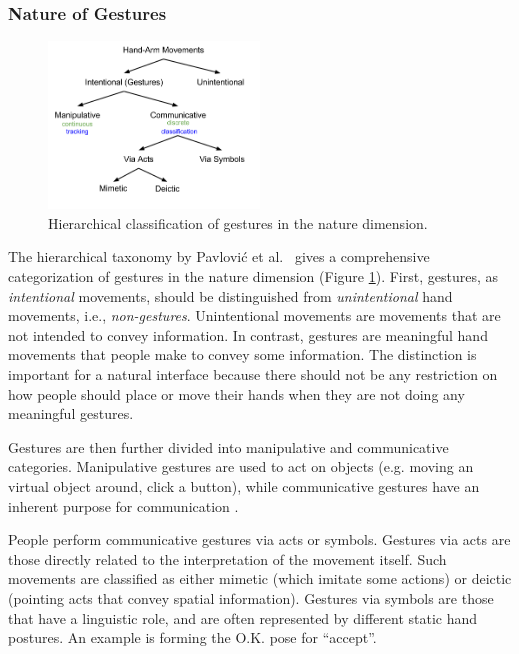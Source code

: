 \subsubsection{Nature of Gestures}
\begin{figure}[tbh]
  \centering
  \includegraphics[width=0.5\textwidth]{figures/taxonomy.png} 
  \caption{Hierarchical classification of gestures in the nature dimension.}
  \label{fig:taxonomy}
\end{figure}

The hierarchical taxonomy by Pavlovi\'{c} et al.~\cite{Pavlovic97} gives
a comprehensive categorization of gestures in the nature dimension (Figure
\ref{fig:taxonomy}).
First, gestures, as \textit{intentional} movements, should be distinguished from \textit{unintentional} hand movements, i.e., \textit{non-gestures}.
Unintentional movements are movements that are not intended to convey
information. In contrast, gestures are meaningful hand movements that people make to convey some
information. The distinction is important for a natural interface because there
should not be any restriction on how people should place or move their hands
when they are not doing any meaningful gestures.  


Gestures are then further divided into manipulative and communicative
categories. Manipulative gestures are used to act on objects (e.g.
moving an virtual object around, click a button), while
communicative gestures have an inherent purpose for communication \cite{Pavlovic97}. 

People perform communicative gestures via acts or symbols. Gestures via acts are
those directly related to the interpretation of the movement itself. Such
movements are classified as either mimetic (which imitate some actions) or
deictic (pointing acts that convey spatial information). Gestures via symbols
are those that have a linguistic role, and are often represented by different static hand postures. An example is forming the
O.K. pose for ``accept''. 

